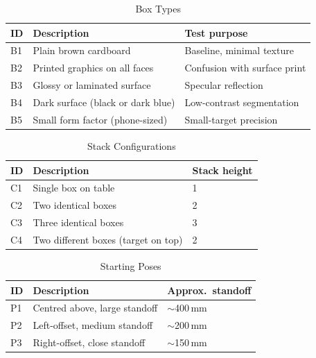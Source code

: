 \documentclass[lettersize,journal]{IEEEtran}
\begin{document}
\begin{table}[h]
  \centering
  \caption{Box Types}
  \label{tab:boxes}
  \begin{tabular}{@{}lll@{}}
    \toprule
    ID & Description & Test purpose \\
    \midrule
    B1 & Plain brown cardboard             & Baseline, minimal texture \\
    B2 & Printed graphics on all faces     & Confusion with surface print \\
    B3 & Glossy or laminated surface       & Specular reflection \\
    B4 & Dark surface (black or dark blue) & Low-contrast segmentation \\
    B5 & Small form factor (phone-sized)   & Small-target precision \\
    \bottomrule
  \end{tabular}
\end{table}

\begin{table}[h]
  \centering
  \caption{Stack Configurations}
  \label{tab:configs}
  \begin{tabular}{@{}lll@{}}
    \toprule
    ID & Description         & Stack height \\
    \midrule
    C1 & Single box on table & 1 \\
    C2 & Two identical boxes & 2 \\
    C3 & Three identical boxes & 3 \\
    C4 & Two different boxes (target on top) & 2 \\
    \bottomrule
  \end{tabular}
\end{table}

\begin{table}[h]
  \centering
  \caption{Starting Poses}
  \label{tab:poses}
  \begin{tabular}{@{}lll@{}}
    \toprule
    ID & Description                            & Approx.\ standoff \\
    \midrule
    P1 & Centred above, large standoff          & $\sim$400\,mm \\
    P2 & Left-offset, medium standoff           & $\sim$200\,mm \\
    P3 & Right-offset, close standoff           & $\sim$150\,mm \\
    \bottomrule
  \end{tabular}
\end{table}
\end{document}
